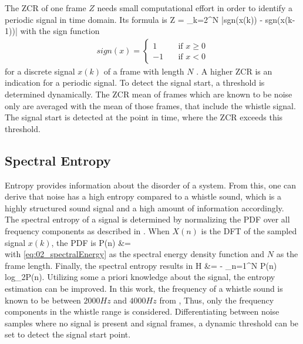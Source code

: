 The \ac{ZCR} of one frame $Z$ needs small computational effort in order to
identify a periodic signal in time domain.
Its formula is
\bal
    Z = \sum_{k=2}^N |sgn(x(k)) - sgn(x(k-1))|
    \label{eq:02_zcr}
\eal
with the sign function
\begin{align*}
    sign(x) =
    \begin{cases}
        1 & \quad \text{if } x\geq 0 \\
        -1 & \quad \text{if } x < 0
    \end{cases}
\end{align*}
for a discrete signal $x(k)$ of a frame with length $N$ \cite{Z_W_voiceActivity}.
A higher \ac{ZCR} is an indication for a periodic signal.
To detect the signal start, a threshold is determined dynamically.
The \ac{ZCR} mean of frames which are known to be noise only
are averaged with the mean of those frames, that include the whistle signal.
The signal start is detected at the point in time, where the \ac{ZCR} exceeds
this threshold.

\subsection{Spectral Entropy}
\label{subsec:02_Entropy}

Entropy provides information about the disorder of a system.
From this, one can derive that noise has a high entropy compared to
a whistle sound, which is a highly structured sound signal and a high
amount of information accordingly.
The spectral entropy of a signal is determined by normalizing the
\ac{PDF} over all frequency components as described in \cite{S_J_entropy}.
When $X(n)$ is the \ac{DFT} of the sampled signal $x(k)$, the \ac{PDF} is
\bal
    P(n) &= 
    \label{eq:02_pdf}\\
\eal
with \cref{eq:02_spectralEnergy} as the spectral energy density function and $N$
as the frame length.
Finally, the spectral entropy results in
\bal
    H &= - \sum_{n=1}^N P(n) log_2P(n).
\eal
\label{eq:02_entropy}
Utilizing some a priori knowledge about the signal, the entropy estimation
can be improved.
In this work, the frequency of a whistle sound is known to be
between $2000\si{Hz}$ and $4000\si{Hz}$ from \cite{Hasselbring},
Thus, only the frequency components in the whistle range is considered.
Differentiating between noise samples where no signal is present and
signal frames, a dynamic threshold can be set to detect the signal start point.